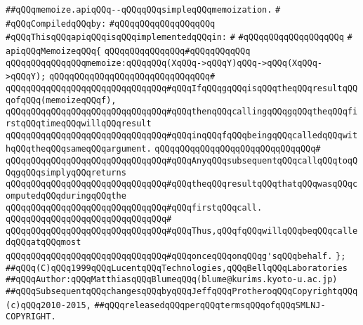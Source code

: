 \label{src/lib/std/memoize.api}
\verb|##qQQqmemoize.apiqQQq--qQQqqQQqsimpleqQQqmemoization.|\newline
\verb|#|\newline
\newline
\verb|#qQQqCompiledqQQqby:|\newline
\verb|#qQQqqQQqqQQqqQQqqQQq|\newline
\newline
\verb|#qQQqThisqQQqapiqQQqisqQQqimplementedqQQqin:|\newline
\verb|#|\newline
\verb|#qQQqqQQqqQQqqQQqqQQq|\newline
\verb|#|\newline
\verb|apiqQQqMemoizeqQQq{|\newline
\verb|qQQqqQQqqQQqqQQq#qQQqqQQqqQQq|\newline
\verb|qQQqqQQqqQQqqQQqmemoize:qQQqqQQq(XqQQq->qQQqY)qQQq->qQQq(XqQQq->qQQqY);|\newline
\verb|qQQqqQQqqQQqqQQqqQQqqQQqqQQqqQQq#|\newline
\verb|qQQqqQQqqQQqqQQqqQQqqQQqqQQqqQQq#qQQqIfqQQqgqQQqisqQQqtheqQQqresultqQQqofqQQq(memoizeqQQqf),|\newline
\verb|qQQqqQQqqQQqqQQqqQQqqQQqqQQqqQQq#qQQqthenqQQqcallingqQQqgqQQqtheqQQqfirstqQQqtimeqQQqwillqQQqresult|\newline
\verb|qQQqqQQqqQQqqQQqqQQqqQQqqQQqqQQq#qQQqinqQQqfqQQqbeingqQQqcalledqQQqwithqQQqtheqQQqsameqQQqargument.|\newline
\verb|qQQqqQQqqQQqqQQqqQQqqQQqqQQqqQQq#|\newline
\verb|qQQqqQQqqQQqqQQqqQQqqQQqqQQqqQQq#qQQqAnyqQQqsubsequentqQQqcallqQQqtoqQQqgqQQqsimplyqQQqreturns|\newline
\verb|qQQqqQQqqQQqqQQqqQQqqQQqqQQqqQQq#qQQqtheqQQqresultqQQqthatqQQqwasqQQqcomputedqQQqduringqQQqthe|\newline
\verb|qQQqqQQqqQQqqQQqqQQqqQQqqQQqqQQq#qQQqfirstqQQqcall.|\newline
\verb|qQQqqQQqqQQqqQQqqQQqqQQqqQQqqQQq#|\newline
\verb|qQQqqQQqqQQqqQQqqQQqqQQqqQQqqQQq#qQQqThus,qQQqfqQQqwillqQQqbeqQQqcalledqQQqatqQQqmost|\newline
\verb|qQQqqQQqqQQqqQQqqQQqqQQqqQQqqQQq#qQQqonceqQQqonqQQqg'sqQQqbehalf.|\newline
\verb|};|\newline
\newline
\newline
\verb|##qQQq(C)qQQq1999qQQqLucentqQQqTechnologies,qQQqBellqQQqLaboratories|\newline
\verb|##qQQqAuthor:qQQqMatthiasqQQqBlumeqQQq(blume@kurims.kyoto-u.ac.jp)|\newline
\verb|##qQQqSubsequentqQQqchangesqQQqbyqQQqJeffqQQqProtheroqQQqCopyrightqQQq(c)qQQq2010-2015,|\newline
\verb|##qQQqreleasedqQQqperqQQqtermsqQQqofqQQqSMLNJ-COPYRIGHT.|\newline
\newline

